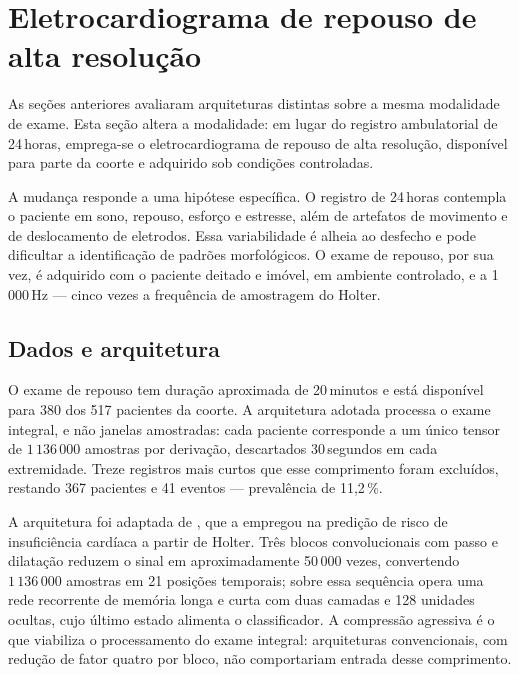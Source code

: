 %

\section{Eletrocardiograma de repouso de alta resolução}
\label{sec:resultados-cnnlstm-repouso}

As seções anteriores avaliaram arquiteturas distintas sobre a mesma
modalidade de exame. Esta seção altera a modalidade: em lugar do registro
ambulatorial de 24\,horas, emprega-se o eletrocardiograma de repouso de alta
resolução, disponível para parte da coorte e adquirido sob condições
controladas.

A mudança responde a uma hipótese específica. O registro de 24\,horas
contempla o paciente em sono, repouso, esforço e estresse, além de artefatos
de movimento e de deslocamento de eletrodos. Essa variabilidade é alheia ao
desfecho e pode dificultar a identificação de padrões morfológicos. O exame
de repouso, por sua vez, é adquirido com o paciente deitado e imóvel, em
ambiente controlado, e a 1\,000\,Hz --- cinco vezes a frequência de
amostragem do Holter.

\subsection{Dados e arquitetura}
\label{subsec:cnnlstm-dados}

O exame de repouso tem duração aproximada de 20\,minutos e está disponível
para 380 dos 517 pacientes da coorte. A arquitetura adotada processa o exame
integral, e não janelas amostradas: cada paciente corresponde a um único
tensor de $1\,136\,000$ amostras por derivação, descartados 30\,segundos em
cada extremidade. Treze registros mais curtos que esse comprimento foram
excluídos, restando 367 pacientes e 41 eventos --- prevalência de 11,2\,\%.

A arquitetura foi adaptada de , que a
empregou na predição de risco de insuficiência cardíaca a partir de Holter.
Três blocos convolucionais com passo e dilatação reduzem o sinal em
aproximadamente 50\,000 vezes, convertendo $1\,136\,000$ amostras em 21
posições temporais; sobre essa sequência opera uma rede recorrente de memória
longa e curta com duas camadas e 128 unidades ocultas, cujo último estado
alimenta o classificador. A compressão agressiva é o que viabiliza o
processamento do exame integral: arquiteturas convencionais, com redução de
fator quatro por bloco, não comportariam entrada desse comprimento.

